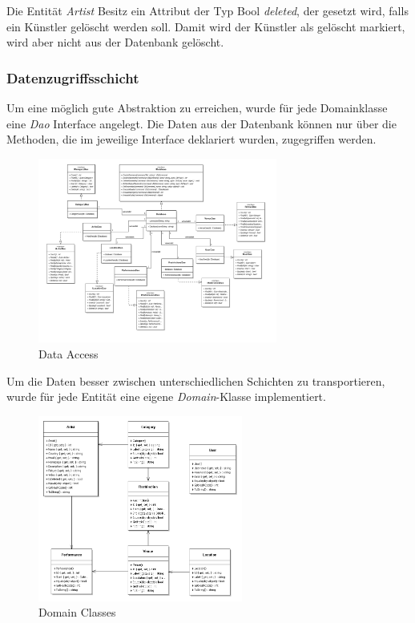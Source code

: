 \documentclass[12pt, a4paper]{article}
\begin{document}
Die Entität \textit{Artist} Besitz ein Attribut der Typ Bool \textit{deleted}, der gesetzt wird, falls ein Künstler gelöscht werden soll. Damit wird der Künstler als gelöscht markiert, wird aber nicht aus der Datenbank gelöscht.

\subsubsection{Datenzugriffsschicht}

Um eine möglich gute Abstraktion zu erreichen, wurde für jede Domainklasse eine \textit{Dao} Interface angelegt. Die Daten aus der Datenbank können nur über die Methoden, die im jeweilige Interface deklariert wurden, zugegriffen werden.

\begin{figure}[h] 	
	\centering
		\includegraphics[width=0.7\textwidth]{Dao.png}
	\caption{Data Access}
\end{figure}

Um die Daten besser zwischen unterschiedlichen Schichten zu transportieren, wurde für jede Entität eine eigene \textit{Domain}-Klasse implementiert.

\begin{figure}[h] 	
	\centering
		\includegraphics[width=0.6\textwidth]{DomainClasses.png}
	\caption{Domain Classes}
\end{figure}
\end{document}
